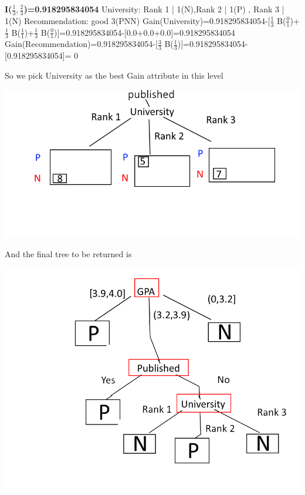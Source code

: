 \documentclass[12pt, letterpaper]{article}
\begin{document}
	\textbf{I($\frac{1}{3},\frac{2}{3}$)=0.918295834054}\newline	
	University: Rank 1 | 1(N),Rank 2 | 1(P) , Rank 3 | 1(N)\newline
	Recommendation: good 3(PNN)\newline
	Gain(University)=0.918295834054-[$\frac{1}{3}$ B($\frac{0}{1}$)+$\frac{1}{3}$ B($\frac{1}{1}$)+$\frac{1}{3}$ B($\frac{0}{1}$)]=0.918295834054-[0.0+0.0+0.0]=0.918295834054\newline\newline
	Gain(Recommendation)=0.918295834054-[$\frac{3}{3}$ B($\frac{1}{3}$)]=0.918295834054-[0.918295834054]= 0\newline
	
	So we pick University as the best Gain attribute in this level
	
	\includegraphics[scale=0.8]{"problem-2-step3"}
	
	
	And the final tree to be returned is
	
	\includegraphics[scale=0.6]{"problem-2-final"}
	
\end{document}
